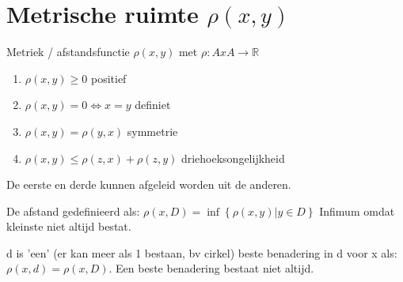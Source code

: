 \section{Metrische ruimte $\rho(x,y)$}
Metriek / afstandsfunctie $\rho (x,y) $ met $ \rho : A x A \rightarrow \mathbb{R} $  
\begin{enumerate}
\item $\rho (x,y) \geq 0 $ positief 
\item $\rho (x,y) = 0 \Leftrightarrow x=y $ definiet
\item $\rho (x,y)=\rho(y,x) $ symmetrie
\item $\rho (x,y) \leq \rho(z,x)+\rho(z,y) $ driehoeksongelijkheid
\end{enumerate}
De eerste en derde kunnen afgeleid worden uit de anderen.

De afstand gedefinieerd als: $\rho(x,D) = \inf \left\{\rho(x,y)| y \in D\right\}$
Infimum omdat kleinste niet altijd bestat.

d is 'een' (er kan meer als 1 bestaan, bv cirkel) beste benadering in d voor x als: $\rho(x,d) = \rho(x,D) $. Een beste benadering bestaat niet altijd. 

